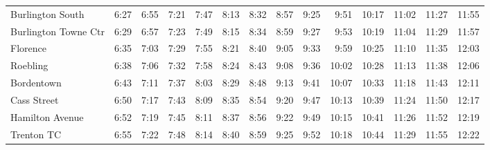 \begin{center}
\begin{tabular}{@{}lrrrrrrrrrrrrr@{}}
Burlington South & 6:27 & 6:55 & 7:21 & 7:47 & 8:13 & 8:32 & 8:57 & 9:25 & 9:51 & 10:17 & 11:02 & 11:27 & 11:55 \\
Burlington Towne Ctr & 6:29 & 6:57 & 7:23 & 7:49 & 8:15 & 8:34 & 8:59 & 9:27 & 9:53 & 10:19 & 11:04 & 11:29 & 11:57 \\
Florence & 6:35 & 7:03 & 7:29 & 7:55 & 8:21 & 8:40 & 9:05 & 9:33 & 9:59 & 10:25 & 11:10 & 11:35 & 12:03 \\
Roebling & 6:38 & 7:06 & 7:32 & 7:58 & 8:24 & 8:43 & 9:08 & 9:36 & 10:02 & 10:28 & 11:13 & 11:38 & 12:06 \\
Bordentown & 6:43 & 7:11 & 7:37 & 8:03 & 8:29 & 8:48 & 9:13 & 9:41 & 10:07 & 10:33 & 11:18 & 11:43 & 12:11 \\
Cass Street & 6:50 & 7:17 & 7:43 & 8:09 & 8:35 & 8:54 & 9:20 & 9:47 & 10:13 & 10:39 & 11:24 & 11:50 & 12:17 \\
Hamilton Avenue & 6:52 & 7:19 & 7:45 & 8:11 & 8:37 & 8:56 & 9:22 & 9:49 & 10:15 & 10:41 & 11:26 & 11:52 & 12:19 \\
Trenton TC & 6:55 & 7:22 & 7:48 & 8:14 & 8:40 & 8:59 & 9:25 & 9:52 & 10:18 & 10:44 & 11:29 & 11:55 & 12:22 \\
\bottomrule\end{tabular}\end{center}
